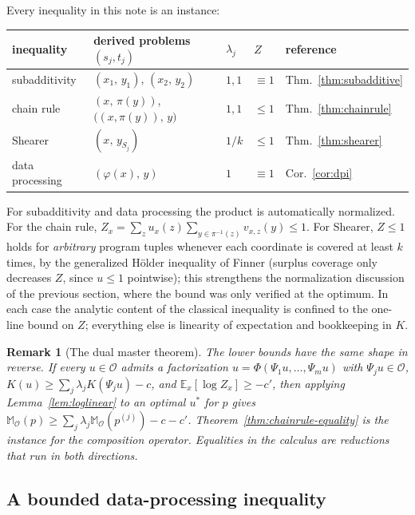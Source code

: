 \documentclass[11pt]{article}
\newtheorem{remark}{Remark}
\begin{document}
Every inequality in this note is an instance:

\begin{center}
\begin{tabular}{lllll}
inequality & derived problems $(s_j, t_j)$ & $\lambda_j$ & $Z$ & reference \\
\hline
subadditivity & $(x_1,\, y_1)$, $(x_2,\, y_2)$ & $1, 1$ & $\equiv 1$ & Thm.~\ref{thm:subadditive} \\
chain rule & $(x,\, \pi(y))$, $\big((x,\pi(y)),\, y\big)$ & $1, 1$ & $\leq 1$ & Thm.~\ref{thm:chainrule} \\
Shearer & $(x,\, y_{S_j})$ & $1/k$ & $\leq 1$ & Thm.~\ref{thm:shearer} \\
data processing & $(\varphi(x),\, y)$ & $1$ & $\equiv 1$ & Cor.~\ref{cor:dpi} \\
\end{tabular}
\end{center}

For subadditivity and data processing the product is automatically normalized. For the chain rule, $Z_x = \sum_z u_x(z) \sum_{y \in \pi^{-1}(z)} v_{x,z}(y) \leq 1$. For Shearer, $Z \leq 1$ holds for \emph{arbitrary} program tuples whenever each coordinate is covered at least $k$ times, by the generalized H\"older inequality of Finner (surplus coverage only decreases $Z$, since $u \leq 1$ pointwise); this strengthens the normalization discussion of the previous section, where the bound was only verified at the optimum. In each case the analytic content of the classical inequality is confined to the one-line bound on $Z$; everything else is linearity of expectation and bookkeeping in $K$.

\begin{remark}[The dual master theorem]
The lower bounds have the same shape in reverse. If every $u \in \mathcal O$ admits a factorization $u = \Phi(\Psi_1 u, \ldots, \Psi_m u)$ with $\Psi_j u \in \mathcal O$, $K(u) \geq \sum_j \lambda_j K(\Psi_j u) - c$, and $\mathbb E_x[\log Z_x] \geq -c'$, then applying Lemma~\ref{lem:loglinear} to an optimal $u^*$ for $p$ gives $\mathbb M_\mathcal{O}(p) \geq \sum_j \lambda_j \mathbb M_\mathcal{O}(p^{(j)}) - c - c'$. Theorem~\ref{thm:chainrule-equality} is the instance for the composition operator. Equalities in the calculus are reductions that run in both directions.
\end{remark}

\subsection*{A bounded data-processing inequality}
\end{document}
